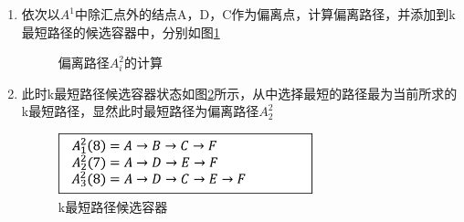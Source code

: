 \begin{enumerate}
    \item 依次以$A^1$中除汇点外的结点A，D，C作为偏离点，计算偏离路径，并添加到k最短路径的候选容器中，分别如图\ref{fig:fig20}
    \begin{figure}[htbp]
        \centering  %
        \quad
        \quad
        \quad
        \caption{偏离路径$A_i^2$的计算}
        \label{fig:fig20}
    \end{figure}

    \item 此时k最短路径候选容器状态如图\ref{fig:fig202}所示，从中选择最短的路径最为当前所求的k最短路径，显然此时最短路径为偏离路径$A_2^2$
    \begin{figure}[H] %
        \centering %
        \includegraphics[width=0.7\textwidth]{png/图片20 k最短路径候选容器} %
        \caption{k最短路径候选容器} %
        \label{fig:fig202} %
    \end{figure}


\end{enumerate}

